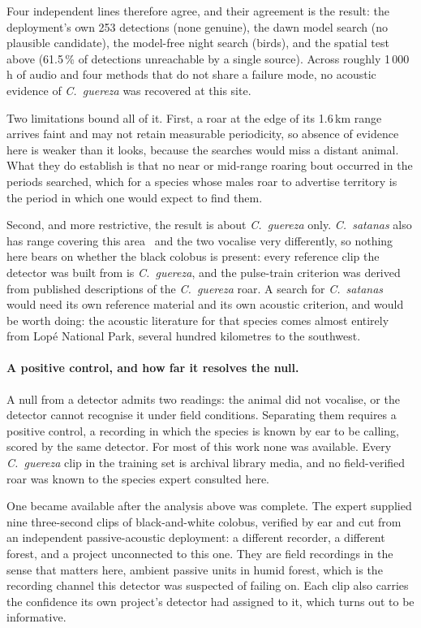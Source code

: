 \documentclass[review,3p,times]{elsarticle}
\begin{document}
Four independent lines therefore agree, and their agreement is the result:
the deployment's own 253 detections (none genuine), the dawn model search (no
plausible candidate), the model-free night search (birds), and the spatial test
above (61.5\,\% of detections unreachable by a single source). Across roughly
1\,000\,h of audio and four methods that do not share a failure mode, no
acoustic evidence of \textit{C.\ guereza} was recovered at this site.

Two limitations bound all of it. First, a roar at the edge of its 1.6\,km range
arrives faint and may not retain measurable periodicity, so absence of evidence
here is weaker than it looks, because the searches would miss a distant animal.
What they do establish is that no near or mid-range roaring bout occurred in the
periods searched, which for a species whose males roar to advertise territory is
the period in which one would expect to find them.

Second, and more restrictive, the result is about \textit{C.\ guereza} only.
\textit{C.\ satanas} also has range covering this area~\cite{iucnsatanas2020}
and the two vocalise very differently, so nothing here bears on whether the
black colobus is present: every reference clip the detector was built from is
\textit{C.\ guereza}, and the pulse-train criterion was derived from published
descriptions of the \textit{C.\ guereza} roar. A search for \textit{C.\ satanas}
would need its own reference material and its own acoustic criterion, and would
be worth doing: the acoustic literature for that species comes almost entirely
from Lopé National Park, several hundred kilometres to the southwest.

\paragraph{A positive control, and how far it resolves the null.}
A null from a detector admits two readings: the animal did not vocalise, or the
detector cannot recognise it under field conditions. Separating them requires a
positive control, a recording in which the species is known by ear to be calling,
scored by the same detector. For most of this work none was available. Every
\textit{C.\ guereza} clip in the training set is archival library media, and no
field-verified roar was known to the species expert consulted here.

One became available after the analysis above was complete. The expert supplied
nine three-second clips of black-and-white colobus, verified by ear and cut from
an independent passive-acoustic deployment: a different recorder, a different
forest, and a project unconnected to this one. They are field recordings in the
sense that matters here, ambient passive units in humid forest, which is the
recording channel this detector was suspected of failing on. Each clip also
carries the confidence its own project's detector had assigned to it, which
turns out to be informative.
\end{document}
